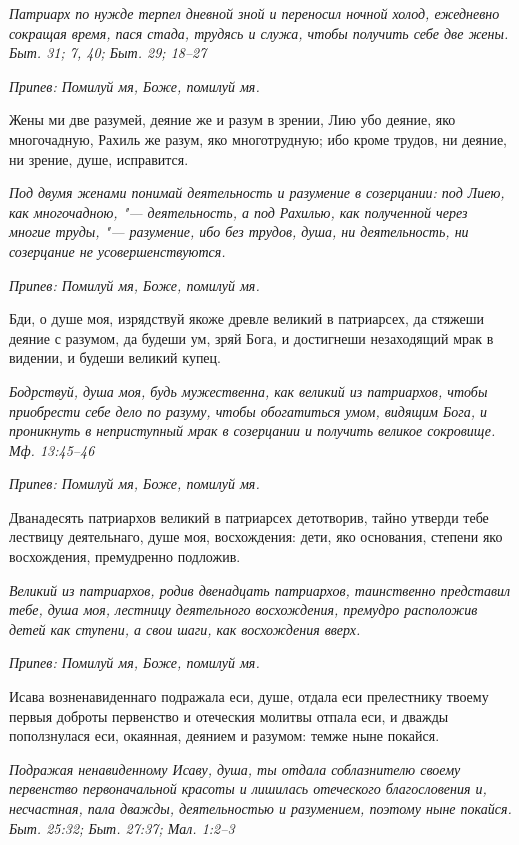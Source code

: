 \itshape Патриарх по нужде терпел дневной зной и переносил ночной холод, ежедневно сокращая время, пася стада, трудясь и служа, чтобы получить себе две жены. Быт. 31; 7, 40; Быт. 29; 18–27\normalfont{}


\itshape Припев:\normalfont{} Помилуй мя, Боже, помилуй мя.


Жены ми две разумей, деяние же и разум в зрении, Лию убо деяние, яко многочадную, Рахиль же разум, яко многотрудную; ибо кроме трудов, ни деяние, ни зрение, душе, исправится.


\itshape Под двумя женами понимай деятельность и разумение в созерцании: под Лиею, как многочадною, "--- деятельность, а под Рахилью, как полученной через многие труды, "--- разумение, ибо без трудов, душа, ни деятельность, ни созерцание не усовершенствуются.\normalfont{}


\itshape Припев:\normalfont{} Помилуй мя, Боже, помилуй мя.


Бди, о душе моя, изрядствуй якоже древле великий в патриарсех, да стяжеши деяние с разумом, да будеши ум, зряй Бога, и достигнеши незаходящий мрак в видении, и будеши великий купец.


\itshape Бодрствуй, душа моя, будь мужественна, как великий из патриархов, чтобы приобрести себе дело по разуму, чтобы обогатиться умом, видящим Бога, и проникнуть в неприступный мрак в созерцании и получить великое сокровище. Мф. 13:45–46\normalfont{}


\itshape Припев:\normalfont{} Помилуй мя, Боже, помилуй мя.


Дванадесять патриархов великий в патриарсех детотворив, тайно утверди тебе лествицу деятельнаго, душе моя, восхождения: дети, яко основания, степени яко восхождения, премудренно подложив.


\itshape Великий из патриархов, родив двенадцать патриархов, таинственно представил тебе, душа моя, лестницу деятельного восхождения, премудро расположив детей как ступени, а свои шаги, как восхождения вверх.\normalfont{}


\itshape Припев:\normalfont{} Помилуй мя, Боже, помилуй мя.


Исава возненавиденнаго подражала еси, душе, отдала еси прелестнику твоему первыя доброты первенство и отеческия молитвы отпала еси, и дважды поползнулася еси, окаянная, деянием и разумом: темже ныне покайся.


\itshape Подражая ненавиденному Исаву, душа, ты отдала соблазнителю своему первенство первоначальной красоты и лишилась отеческого благословения и, несчастная, пала дважды, деятельностью и разумением, поэтому ныне покайся. Быт. 25:32; Быт. 27:37; Мал. 1:2–3\normalfont{}


